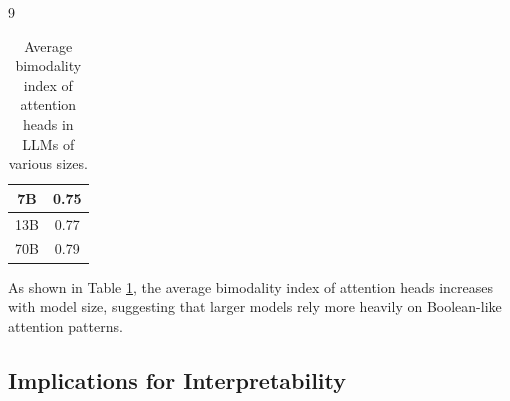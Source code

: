 \documentclass[11pt]{article}
\theoremstyle{definition}
\begin{document}
\begin{thebibliography}{9}
\begin{table}[h]
\begin{tabular}{|c|c|}
\hline






7B & 0.75 \\






\hline






13B & 0.77 \\






\hline






70B & 0.79 \\






\hline






\end{tabular}






\caption{Average bimodality index of attention heads in LLMs of various sizes.}






\label{tab:bimodality-index}






\end{table}













As shown in Table \ref{tab:bimodality-index}, the average bimodality index of attention heads increases with model size, suggesting that larger models rely more heavily on Boolean-like attention patterns.













\subsection{Implications for Interpretability}







\end{thebibliography}
\end{document}
